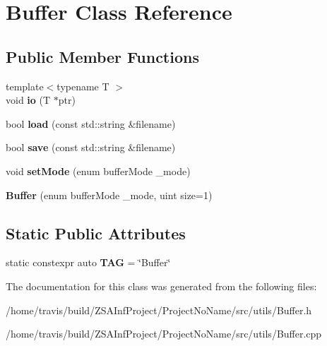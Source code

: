 \hypertarget{classBuffer}{\section{Buffer Class Reference}
\label{classBuffer}
}
\subsection*{Public Member Functions}
\begin{DoxyCompactItemize}
\item 
\hypertarget{classBuffer_a0c119cd2bde0f5e099ae5a7d603edf57}{{\footnotesize template$<$typename T $>$ }\\void {\bfseries io} (T $\ast$ptr)}\label{classBuffer_a0c119cd2bde0f5e099ae5a7d603edf57}

\item 
\hypertarget{classBuffer_a3658c31d018d2b35aece3adc7b174607}{bool {\bfseries load} (const std\-::string \&filename)}\label{classBuffer_a3658c31d018d2b35aece3adc7b174607}

\item 
\hypertarget{classBuffer_a7972aa16337fe9ad4ea68bbd384cae5e}{bool {\bfseries save} (const std\-::string \&filename)}\label{classBuffer_a7972aa16337fe9ad4ea68bbd384cae5e}

\item 
\hypertarget{classBuffer_a9b59c9981c93320d2ce9d383aef7e4c6}{void {\bfseries set\-Mode} (enum buffer\-Mode \-\_\-mode)}\label{classBuffer_a9b59c9981c93320d2ce9d383aef7e4c6}

\item 
\hypertarget{classBuffer_a23acbe173401be19d6efdad659ee921b}{{\bfseries Buffer} (enum buffer\-Mode \-\_\-mode, uint size=1)}\label{classBuffer_a23acbe173401be19d6efdad659ee921b}

\end{DoxyCompactItemize}
\subsection*{Static Public Attributes}
\begin{DoxyCompactItemize}
\item 
\hypertarget{classBuffer_a41df64a7099b47621b3a70f13f5a2602}{static constexpr auto {\bfseries T\-A\-G} = \char`\"{}Buffer\char`\"{}}\label{classBuffer_a41df64a7099b47621b3a70f13f5a2602}

\end{DoxyCompactItemize}


The documentation for this class was generated from the following files\-:\begin{DoxyCompactItemize}
\item 
/home/travis/build/\-Z\-S\-A\-Inf\-Project/\-Project\-No\-Name/src/utils/Buffer.\-h\item 
/home/travis/build/\-Z\-S\-A\-Inf\-Project/\-Project\-No\-Name/src/utils/Buffer.\-cpp\end{DoxyCompactItemize}
